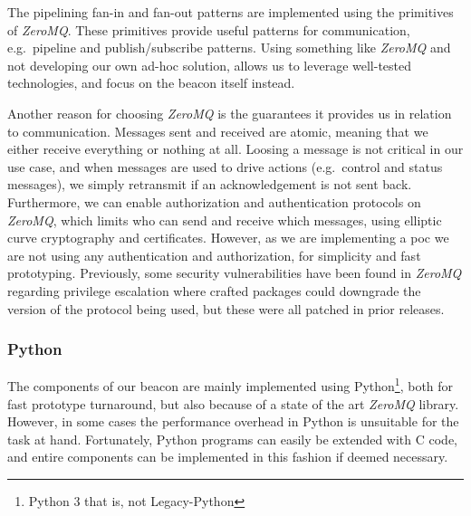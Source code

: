 The pipelining fan-in and fan-out patterns are implemented using the primitives of \textit{ZeroMQ}.
These primitives provide useful patterns for communication, e.g.\ pipeline and publish/subscribe patterns.
Using something like \textit{ZeroMQ} and not developing our own ad-hoc solution, allows us to leverage well-tested technologies, and focus on the beacon itself instead.

Another reason for choosing \textit{ZeroMQ} is the guarantees it provides us in relation to communication.
Messages sent and received are atomic, meaning that we either receive everything or nothing at all.
Loosing a message is not critical in our use case, and when messages are used to drive actions (e.g.\ control and status messages), we simply retransmit if an acknowledgement is not sent back.
Furthermore, we can enable authorization and authentication protocols on \textit{ZeroMQ}, which limits who can send and receive which messages, using elliptic curve cryptography and certificates.
However, as we are implementing a \gls{poc} we are not using any authentication and authorization, for simplicity and fast prototyping.
Previously, some security vulnerabilities have been found in \textit{ZeroMQ} regarding privilege escalation where crafted packages could downgrade the version of the protocol being used, but these were all patched in prior releases.


\subsubsection{Python}
The components of our beacon are mainly implemented using Python\footnote{Python 3 that is, not Legacy-Python}, both for fast prototype turnaround, but also because of a state of the art \textit{ZeroMQ} library.
However, in some cases the performance overhead in Python is unsuitable for the task at hand.
Fortunately, Python programs can easily be extended with C code, and entire components can be implemented in this fashion if deemed necessary.
